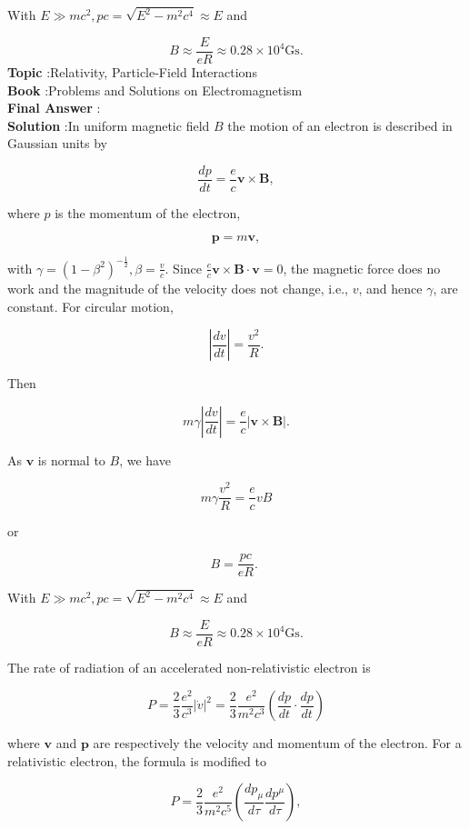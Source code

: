 \documentclass[10pt]{article}
\begin{document}
With $E \gg m c^{2}, p c=\sqrt{E^{2}-m^{2} c^{4}} \approx E$ and

$$
B \approx \frac{E}{e R} \approx 0.28 \times 10^{4} \mathrm{Gs} .
$$
\textbf{Topic} :Relativity, Particle-Field Interactions\\
\textbf{Book} :Problems and Solutions on Electromagnetism\\
\textbf{Final Answer} :\\


\textbf{Solution} :In uniform magnetic field $B$ the motion of an electron is described in Gaussian units by

$$
\frac{d p}{d t}=\frac{e}{c} \mathbf{v} \times \mathbf{B},
$$

where $p$ is the momentum of the electron,

$$
\mathbf{p}=m \boldsymbol{v},
$$

with $\gamma=\left(1-\beta^{2}\right)^{-\frac{1}{2}}, \beta=\frac{v}{c}$. Since $\frac{e}{c} \mathbf{v} \times \mathbf{B} \cdot \mathbf{v}=0$, the magnetic force does no work and the magnitude of the velocity does not change, i.e., $v$, and hence $\gamma$, are constant. For circular motion,

$$
\left|\frac{d v}{d t}\right|=\frac{v^{2}}{R} .
$$

Then

$$
m \gamma\left|\frac{d v}{d t}\right|=\frac{e}{c}|\mathbf{v} \times \mathbf{B}| .
$$

As $\mathbf{v}$ is normal to $B$, we have

$$
m \gamma \frac{v^{2}}{R}=\frac{e}{c} v B
$$

or

$$
B=\frac{p c}{e R} \text {. }
$$

With $E \gg m c^{2}, p c=\sqrt{E^{2}-m^{2} c^{4}} \approx E$ and

$$
B \approx \frac{E}{e R} \approx 0.28 \times 10^{4} \mathrm{Gs} .
$$

 The rate of radiation of an accelerated non-relativistic electron is

$$
P=\frac{2}{3} \frac{e^{2}}{c^{3}}|\dot{v}|^{2}=\frac{2}{3} \frac{e^{2}}{m^{2} c^{3}}\left(\frac{d p}{d t} \cdot \frac{d p}{d t}\right)
$$

where $\mathbf{v}$ and $\mathbf{p}$ are respectively the velocity and momentum of the electron. For a relativistic electron, the formula is modified to

$$
P=\frac{2}{3} \frac{e^{2}}{m^{2} c^{5}}\left(\frac{d p_{\mu}}{d \tau} \frac{d p^{\mu}}{d \tau}\right),
$$
\end{document}
